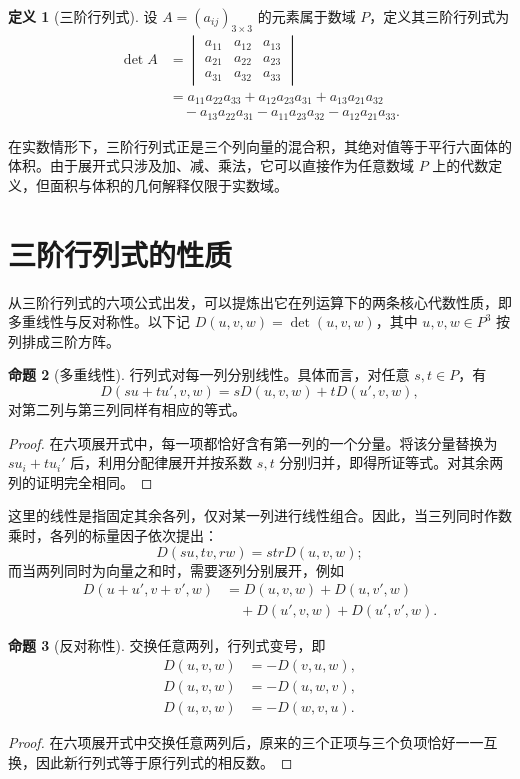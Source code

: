\documentclass[UTF8, fontset=fandol, a4paper, 12pt]{ctexart}
\theoremstyle{definition}
\newtheorem{definition}{定义}[section]
\newtheorem{proposition}[definition]{命题}
\begin{document}
\begin{definition}[三阶行列式]
设 $A=(a_{ij})_{3\times3}$ 的元素属于数域 $P$，定义其三阶行列式为
\begin{align*}
\det A
&=\begin{vmatrix}a_{11}&a_{12}&a_{13}\\a_{21}&a_{22}&a_{23}\\a_{31}&a_{32}&a_{33}\end{vmatrix}\\
&=a_{11}a_{22}a_{33}+a_{12}a_{23}a_{31}+a_{13}a_{21}a_{32}\\
&\quad-a_{13}a_{22}a_{31}-a_{11}a_{23}a_{32}-a_{12}a_{21}a_{33}.
\end{align*}
\end{definition}

在实数情形下，三阶行列式正是三个列向量的混合积，其绝对值等于平行六面体的体积。由于展开式只涉及加、减、乘法，它可以直接作为任意数域 $P$ 上的代数定义，但面积与体积的几何解释仅限于实数域。

\section{三阶行列式的性质}

从三阶行列式的六项公式出发，可以提炼出它在列运算下的两条核心代数性质，即多重线性与反对称性。以下记 $D(u,v,w)=\det(u,v,w)$，其中 $u,v,w\in P^3$ 按列排成三阶方阵。

\begin{proposition}[多重线性]
行列式对每一列分别线性。具体而言，对任意 $s,t\in P$，有
\[
D(su+tu',v,w)=sD(u,v,w)+tD(u',v,w),
\]
对第二列与第三列同样有相应的等式。
\end{proposition}
\begin{proof}
在六项展开式中，每一项都恰好含有第一列的一个分量。将该分量替换为 $su_i+tu_i'$ 后，利用分配律展开并按系数 $s,t$ 分别归并，即得所证等式。对其余两列的证明完全相同。
\end{proof}

这里的线性是指固定其余各列，仅对某一列进行线性组合。因此，当三列同时作数乘时，各列的标量因子依次提出：
\[
D(su,tv,rw)=strD(u,v,w);
\]
而当两列同时为向量之和时，需要逐列分别展开，例如
\begin{align*}
D(u+u',v+v',w)
&=D(u,v,w)+D(u,v',w)\\
&\quad+D(u',v,w)+D(u',v',w).
\end{align*}

\begin{proposition}[反对称性]
交换任意两列，行列式变号，即
\begin{align*}
D(u,v,w)&=-D(v,u,w),\\
D(u,v,w)&=-D(u,w,v),\\
D(u,v,w)&=-D(w,v,u).
\end{align*}
\end{proposition}
\begin{proof}
在六项展开式中交换任意两列后，原来的三个正项与三个负项恰好一一互换，因此新行列式等于原行列式的相反数。
\end{proof}
\end{document}
